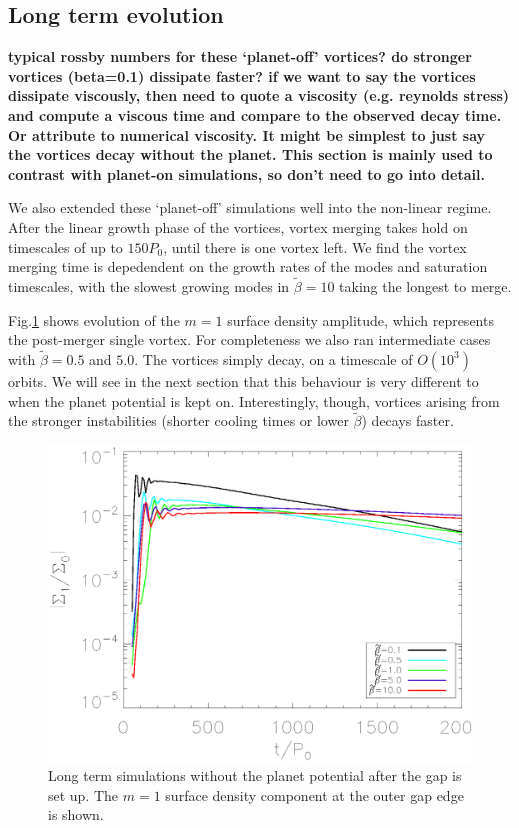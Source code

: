 \subsection{Long term evolution} \label{nonlinearplanetoff} 
{\bf typical rossby numbers for these `planet-off' vortices? do
  stronger vortices (beta=0.1) dissipate faster? if we want to say the
  vortices dissipate viscously, then need to quote a viscosity
  (e.g. reynolds stress) and compute a viscous time and compare to the
  observed decay time. Or attribute to numerical viscosity. It might
  be simplest to just say the vortices decay without the planet. This
  section is mainly used to contrast with planet-on simulations, so
  don't need to go into detail. 
}

We also extended these `planet-off' simulations well into the non-linear
regime. After the linear growth phase of the vortices, vortex merging
takes hold on timescales of up to $150P_0$, until there is one vortex
left. We find the vortex merging
time is depedendent on the growth rates of the modes and saturation
timescales, with the slowest growing modes in $\tilde\beta=10$ taking
the longest to merge.  

Fig.\ref{planetofflifetimeplot} shows evolution of the $m=1$ surface
density amplitude, which represents the post-merger single vortex. For
completeness we also ran intermediate cases with $\tilde{\beta}=0.5$
and $5.0$. The vortices simply decay, on a timescale of $O(10^3)$
orbits. We will see in the next section that this behaviour is very
different to when the planet potential is kept on. Interestingly,
though, vortices arising from the stronger instabilities (shorter
cooling times or lower $\tilde{\beta}$) decays faster.  


\begin{figure}
  \includegraphics[width=\linewidth,clip=true,trim=0.5cm
  0cm 0cm 1.1cm]{figures/longterm_planetoff}
  \caption{Long term simulations without the planet potential after
    the gap is set up. The $m=1$ surface density component at the
    outer gap edge is shown.
  } \label{planetofflifetimeplot}
\end{figure}

